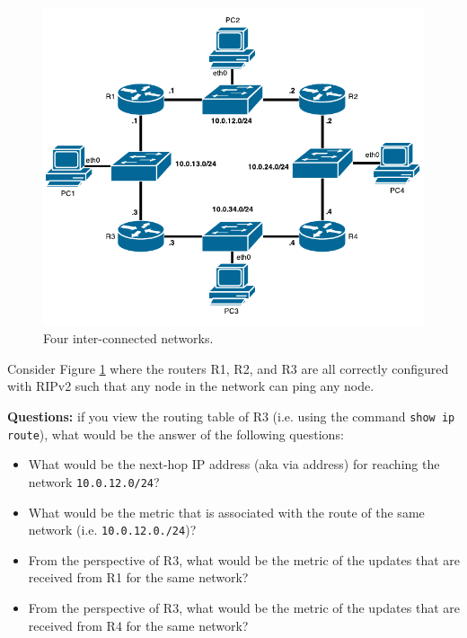 \documentclass[pdftex,12pt,a4paper]{article}
\begin{document}
        \begin{figure}[tbh]
            \centering
            \includegraphics[width=.85\textwidth]{figures/diag0}
            \caption{Four inter-connected networks.}
            \label{fig1}
        \end{figure}

        Consider Figure \ref{fig1} where the routers R1, R2, and R3 are all
        correctly configured with RIPv2 such that any node in the network can
        ping any node.
        
        \textbf{Questions:} if you view the routing table of R3 (i.e. using the command \texttt{show ip
        route}), what would be the answer of the following questions:
        \begin{itemize}
            \item What would be the next-hop IP address (aka via address) for
                reaching the network \texttt{10.0.12.0/24}?
            \item What would be the metric that is associated with the route of
                the same network (i.e. \texttt{10.0.12.0./24})?
            \item From the perspective of R3, what would be the metric of the
                updates that are received from R1 for the same network?
            \item From the perspective of R3, what would be the metric of the
                updates that are received from R4 for the same network?
        \end{itemize}


        \pagebreak
\end{document}
